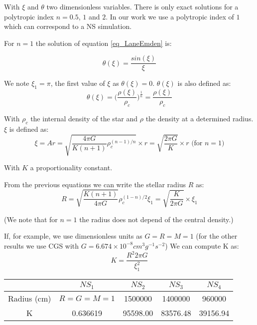 \documentclass[notes.tex]{subfiles}
\begin{document}
With $\xi$ and $\theta$ two dimensionless variables.
There is only exact solutions for a polytropic index $n = 0.5$, $1$ and $2$.
In our work we use a polytropic index of $1$ which can correspond to a NS simulation.

For $n=1$ the solution of equation \ref{eq_LaneEmden} is:

\begin{equation}
\theta(\xi)=\frac{sin(\xi)}{\xi}
\end{equation}

We note $\xi_1 = \pi$, the first value of $\xi$ as $\theta(\xi) = 0$.
$\theta(\xi)$ is also defined as:
\begin{equation}
 \theta(\xi) = \Big(\frac{\rho(\xi)}{\rho_c}\Big)^{\frac{1}{n}}  = \frac{\rho(\xi)}{\rho_c}
\end{equation}

With $\rho_c$ the internal density of the star and $\rho$ the density at a determined radius. $\xi$ is defined as:
$$ \xi = Ar = \sqrt{\frac{4\pi G}{K(n+1)}\rho_c^{(n-1)/n}} \times r = \sqrt{\frac{2\pi G}{K}}\times r \mbox{ (for } n=1 \mbox{)}$$

With $K$ a proportionality constant.

From the previous equations we can write the stellar radius $R$ as:
\begin{equation}
R = \sqrt{\frac{K(n+1)}{4\pi G}}\rho_c^{(1-n)/2}\xi_1 = \sqrt{ \frac{K}{2\pi G} } \times \xi_1
\end{equation}

(We note that for $n=1$ the radius does not depend of the central density.)

If, for example, we use dimensionless units as $G=R=M=1$ (for the other results we use CGS with $G = 6.674 \times 10^{-8} cm^3g^{-1}s^{-2}$)
We can compute K as:
\begin{equation}
\label{eq:constant}
K = \frac{R^2  2 \pi G}{\xi_1^2}
\end{equation}

\begin{center}

\begin{tabular}{c|c|c|c|c|}
 & $NS_1$ & $NS_2$ & $NS_3$ & $NS_4$ \\
\hline
Radius (cm) & $R=G=M=1$ & 1500000 & 1400000 & 960000 \\
\hline
K & 0.636619 & 95598.00 & 83576.48 & 39156.94\\
\hline
\end{tabular}

\end{center}
\end{document}
